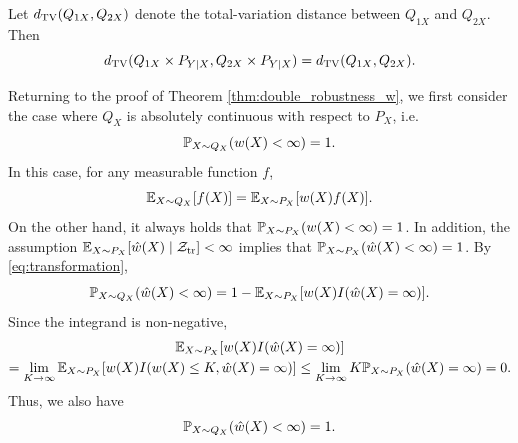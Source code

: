 \begin{lemma}\label{lem:tv}
  Let $\tv(Q_{1X}, Q_{2X})$ denote the total-variation distance between $Q_{1X}$ and $Q_{2X}$. Then
  \[\tv(Q_{1X}\times P_{Y\mid X}, Q_{2X}\times P_{Y\mid X}) = \tv(Q_{1X}, Q_{2X}).\]
\end{lemma}

Returning to the proof of Theorem \ref{thm:double_robustness_w}, we first consider the case where $Q_{X}$ is absolutely continuous with respect to $P_{X}$, i.e.
  \[\P_{X \sim Q_{X}}(w(X) < \infty) = 1.\]
  In this case, for any measurable function $f$,
  \begin{equation}
    \label{eq:transformation}
    \E_{X\sim Q_{X}}[f(X)] = \E_{X\sim P_{X}}[w(X)f(X)].
  \end{equation}
  On the other hand, it always holds that $\P_{X\sim P_{X}}(w(X) < \infty) = 1$. In addition, the assumption $\E_{X\sim P_{X}}[\hat{w}(X)\mid \Z_{\tr}] < \infty$ implies that $\P_{X\sim P_{X}}(\hat{w}(X) < \infty) = 1$. By \eqref{eq:transformation},
  \[\P_{X\sim Q_{X}}(\hat{w}(X) < \infty) = 1 - \E_{X\sim P_{X}}[w(X)I(\hat{w}(X) = \infty)].\]
  Since the integrand is non-negative,
  \begin{multline*}
    \E_{X\sim P_{X}}[w(X)I(\hat{w}(X) = \infty)]\\
    = \lim_{K\rightarrow \infty}\E_{X\sim P_{X}}[w(X)I(w(X)\le K, \hat{w}(X) = \infty)]
     \le \lim_{K\rightarrow \infty} K \P_{X\sim P_{X}}(\hat{w}(X) = \infty) = 0.
  \end{multline*}
  Thus, we also have
  \[\P_{X\sim Q_{X}}(\hat{w}(X) < \infty) = 1.\]


